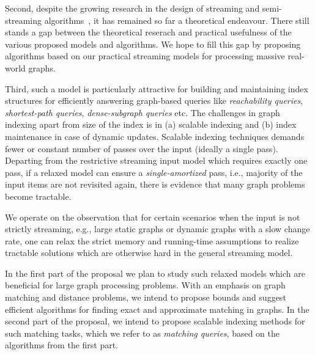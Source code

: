 Second, despite the growing research in the design of streaming and semi-streaming algorithms~\cite{Henzinger}, it has remained so far a theoretical endeavour. There still stands a gap between the theoretical reserach and practical usefulness of the various proposed models and algorithms. We hope to fill this gap by proposing  algorithms based on our practical streaming models for processing massive real-world graphs. 


Third, such a model is particularly attractive for building and maintaining index structures for efficiently answering graph-based queries like \emph{reachability queries}, \emph{shortest-path queries}, \emph{dense-subgraph queries} etc. The challenges in graph indexing apart from size of the index is in (a) scalable indexing and (b) index maintenance in case of dynamic updates. Scalable indexing techniques demands fewer or constant number of passes over the input (ideally a single pass). Departing from the restrictive streaming input model which requires exactly one pass, if a relaxed model can ensure a \emph{single-amortized} pass, i.e., majority of the input items are not revisited again, there is evidence that many graph problems become tractable. 




We operate on the observation that for certain scenarios when the input is not strictly streaming, e.g., large static graphs or dynamic graphs with a slow change rate, one can relax the strict memory and running-time assumptions to realize tractable solutions which are otherwise hard in the general streaming model.  


In the first part of the proposal we plan to study such relaxed models which are beneficial for large graph processing problems. With an emphasis on graph matching and distance problems, we intend to propose bounds and suggest efficient algorithms for finding exact and approximate matching in graphs. In the second part of the proposal, we intend to propose scalable indexing methods for such matching tasks, which we refer to as \emph{matching queries}, based on the algorithms from the first part.


